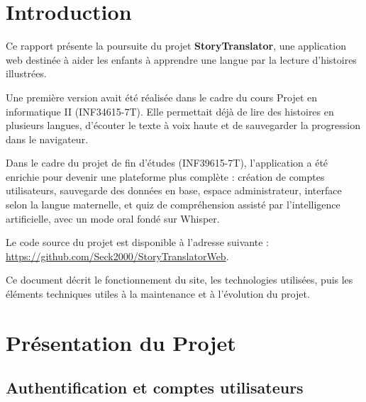 \documentclass[12pt,twoside,letterpaper]{article}
\begin{document}
\begin{titlepage}



\makeatother


\end{titlepage}

\tableofcontents
\newpage

\section{Introduction}

Ce rapport pr\'esente la poursuite du projet \textbf{StoryTranslator},
une application web destin\'ee \`a aider les enfants \`a apprendre une langue
par la lecture d'histoires illustr\'ees.

Une premi\`ere version avait \'et\'e r\'ealis\'ee dans le cadre du cours
Projet en informatique II (INF34615-7T).
Elle permettait d\'ej\`a de lire des histoires en plusieurs langues,
d'\'ecouter le texte \`a voix haute et de sauvegarder la progression
dans le navigateur.

Dans le cadre du projet de fin d'\'etudes (INF39615-7T), l'application a \'et\'e enrichie
pour devenir une plateforme plus compl\`ete :
cr\'eation de comptes utilisateurs, sauvegarde des donn\'ees en base,
espace administrateur, interface selon la langue maternelle,
et quiz de compr\'ehension assist\'e par l'intelligence artificielle,
avec un mode oral fond\'e sur Whisper.

Le code source du projet est disponible \`a l'adresse suivante :
\url{https://github.com/Seck2000/StoryTranslatorWeb}.

Ce document d\'ecrit le fonctionnement du site, les technologies utilis\'ees,
puis les \'el\'ements techniques utiles \`a la maintenance et \`a l'\'evolution du projet.

\newpage

\section{Pr\'esentation du Projet}

\subsection{Authentification et comptes utilisateurs}
\end{document}
